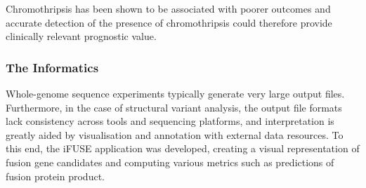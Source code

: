 Chromothripsis has been shown to be associated with poorer outcomes \cite{fontana2018chromothripsis,Hirsch2012,magrangeas2011chromothripsis,molenaar} and accurate detection of the presence of chromothripsis could therefore provide clinically relevant prognostic value.









\subsubsection{The Informatics}
Whole-genome sequence experiments typically generate very large output files. Furthermore, in the case of structural variant analysis, the output file formats lack consistency across tools and sequencing platforms, and interpretation is greatly aided by visualisation and annotation with external data resources. To this end, the iFUSE application was developed, creating a visual representation of fusion gene candidates and computing various metrics such as predictions of fusion protein product.

